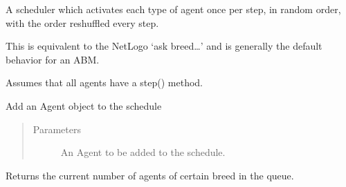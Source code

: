 \documentclass[letterpaper,10pt,english]{sphinxmanual}
\begin{document}
\begin{fulllineitems}
\label{\detokenize{index:examples.sugarscape_cg.sugarscape_cg.schedule.RandomActivationByBreed}}
A scheduler which activates each type of agent once per step, in random
order, with the order reshuffled every step.

This is equivalent to the NetLogo ‘ask breed…’ and is generally the
default behavior for an ABM.

Assumes that all agents have a step() method.

\begin{fulllineitems}
\label{\detokenize{index:examples.sugarscape_cg.sugarscape_cg.schedule.RandomActivationByBreed.add}}
Add an Agent object to the schedule
\begin{quote}\begin{description}
\item[{Parameters}] \leavevmode
{} \textendash{} An Agent to be added to the schedule.

\end{description}\end{quote}

\end{fulllineitems}


\begin{fulllineitems}
\label{\detokenize{index:examples.sugarscape_cg.sugarscape_cg.schedule.RandomActivationByBreed.get_breed_count}}
Returns the current number of agents of certain breed in the queue.

\end{fulllineitems}



\end{fulllineitems}
\end{document}
